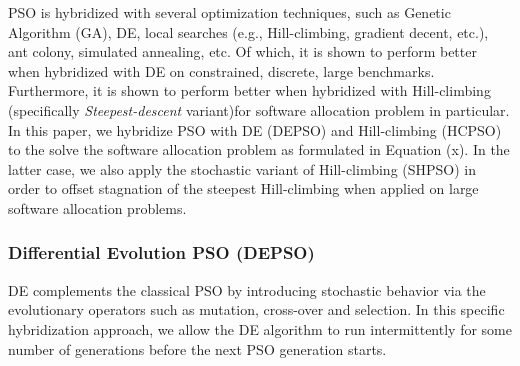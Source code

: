 PSO is hybridized with several optimization techniques, such as Genetic Algorithm (GA), DE, local searches (e.g., Hill-climbing, gradient decent, etc.), ant colony, simulated annealing, etc. Of which, it is shown to perform better when hybridized with DE on constrained, discrete, large benchmarks. Furthermore, it is shown to perform better when hybridized with Hill-climbing (specifically \textit{Steepest-descent} variant)for software allocation problem \cite{} in particular. In this paper, we hybridize PSO with DE (DEPSO) and Hill-climbing (HCPSO) to the solve the software allocation problem as formulated in Equation (x). In the latter case, we also apply the stochastic variant of Hill-climbing (SHPSO) in order to offset stagnation of the steepest Hill-climbing when applied on large software allocation problems.

%
 
\subsubsection{Differential Evolution PSO (DEPSO)}
DE complements the classical PSO by introducing stochastic behavior via the evolutionary operators such as mutation, cross-over and selection. In this specific hybridization approach, we allow the DE algorithm to run intermittently for some number of generations before the next PSO generation starts.

